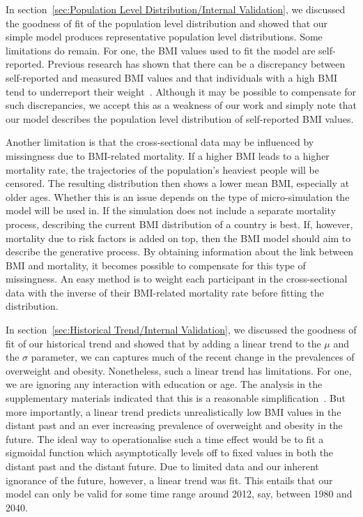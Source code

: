 \documentclass{imammb}
\numberwithin{equation}{section}
\begin{document}
In section~\ref{sec:Population Level Distribution/Internal Validation}, we discussed the goodness of fit of the population level distribution and showed that our simple model produces representative population level distributions. Some limitations do remain. For one, the BMI values used to fit the model are self-reported. Previous research has shown that there can be a discrepancy between self-reported and measured BMI values and that individuals with a high BMI tend to underreport their weight~\citep{Olfert2018}. Although it may be possible to compensate for such discrepancies, we accept this as a weakness of our work and simply note that our model describes the population level distribution of self-reported BMI values.

Another limitation is that the cross-sectional data may be influenced by missingness due to BMI-related mortality. If a higher BMI leads to a higher mortality rate, the trajectories of the population's heaviest people will be censored. The resulting distribution then shows a lower mean BMI, especially at older ages. Whether this is an issue depends on the type of micro-simulation the model will be used in. If the simulation does not include a separate mortality process, describing the current BMI distribution of a country is best. If, however, mortality due to risk factors is added on top, then the BMI model should aim to describe the generative process. By obtaining information about the link between BMI and mortality, it becomes possible to compensate for this type of missingness. An easy method is to weight each participant in the cross-sectional data with the inverse of their BMI-related mortality rate before fitting the distribution.

In section~\ref{sec:Historical Trend/Internal Validation}, we discussed the goodness of fit of our historical trend and showed that by adding a linear trend to the $\mu$ and the $\sigma$ parameter, we can captures much of the recent change in the prevalences of overweight and obesity. Nonetheless, such a linear trend has limitations. For one, we are ignoring any interaction with education or age. The analysis in the supplementary materials indicated that this is a reasonable simplification~\citep{Bogaardt2023}. But more importantly, a linear trend predicts unrealistically low BMI values in the distant past and an ever increasing prevalence of overweight and obesity in the future. The ideal way to operationalise such a time effect would be to fit a sigmoidal function which asymptotically levels off to fixed values in both the distant past and the distant future. Due to limited data and our inherent ignorance of the future, however, a linear trend was fit. This entails that our model can only be valid for some time range around 2012, say, between 1980 and 2040.
\end{document}
